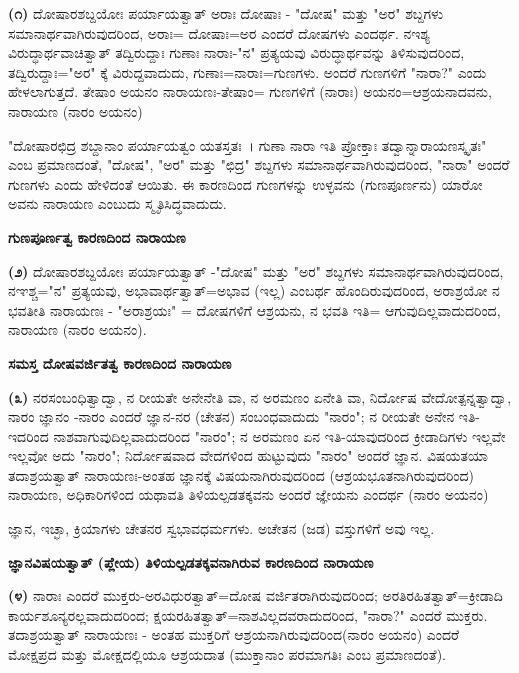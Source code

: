 \smallskip

\textbf{(೧)} ದೋಷಾರಶಬ್ದಯೋಃ ಪರ್ಯಾಯತ್ವಾತ್ ಅರಾಃ ದೋಷಾಃ - "ದೋಷ" ಮತ್ತು "ಅರ" ಶಬ್ದಗಳು ಸಮಾನಾರ್ಥವಾಗಿರುವುದರಿಂದ, ಅರಾಃ= ದೋಷಾಃ=ಅರ ಎಂದರೆ ದೋಷಗಳು ಎಂದರ್ಥ. ನಇಶ್ಯ ವಿರುದ್ಧಾರ್ಥವಾಚಿತ್ವಾತ್ ತದ್ವಿರುದ್ದಾಃ ಗುಣಾಃ ನಾರಾಃ-\-"ನ" ಪ್ರತ್ಯಯವು ವಿರುದ್ಧಾರ್ಥವನ್ನು ತಿಳಿಸುವುದರಿಂದ, ತದ್ವಿರುದ್ದಾಃ="ಅರ" ಕ್ಕೆ ವಿರುದ್ದವಾದುದು, ಗುಣಾಃ=ನಾರಾಃ=ಗುಣಗಳು. ಅಂದರೆ ಗುಣಗಳಿಗೆ "ನಾರಾ?" ಎಂದು ಹೇಳಲಾಗುತ್ತದೆ. ತೇಷಾಂ ಅಯನಂ ನಾರಾಯಣಃ-ತೇಷಾಂ= ಗುಣಗಳಿಗೆ (ನಾರಾಃ) ಅಯನಂ=ಆಶ್ರಯನಾದವನು, ನಾರಾಯಣ (ನಾರಂ ಅಯನಂ)

"ದೋಷಾರಛಿದ್ರ ಶಬ್ದಾನಾಂ ಪರ್ಯಾಯತ್ವಂ ಯತಸ್ತತಃ~। ಗುಣಾ ನಾರಾ ಇತಿ ಪ್ರೋಕ್ತಾಃ ತದ್ವಾನ್ನಾರಾಯಣಸ್ಕೃತಃ" ಎಂಬ ಪ್ರಮಾಣದಂತೆ, "ದೋಷ", "ಅರ" ಮತ್ತು "ಛಿದ್ರ" ಶಬ್ದಗಳು ಸಮಾನಾರ್ಥವಾಗಿರುವುದರಿಂದ, "ನಾರಾ" ಅಂದರೆ ಗುಣಗಳು ಎಂದು ಹೇಳಿದಂತೆ ಆಯಿತು. ಈ ಕಾರಣದಿಂದ ಗುಣಗಳನ್ನು ಉಳ್ಳವನು (ಗುಣಪೂರ್ಣನು) ಯಾರೋ ಅವನು ನಾರಾಯಣ ಎಂಬುದು ಸ್ಮೃತಿಸಿದ್ಧವಾದುದು.

\begin{center}
\textbf{ಗುಣಪೂರ್ಣತ್ವ ಕಾರಣದಿಂದ ನಾರಾಯಣ}
\end{center}

\textbf{(೨)} ದೋಷಾರಶಬ್ದಯೋಃ ಪರ್ಯಾಯತ್ವಾತ್ -"ದೋಷ" ಮತ್ತು "ಅರ" ಶಬ್ದಗಳು ಸಮಾನಾರ್ಥವಾಗಿರುವುದರಿಂದ, ನಞಶ್ಚ="ನ" ಪ್ರತ್ಯಯವು, ಅಭಾವಾರ್ಥತ್ವಾತ್=ಅಭಾವ (ಇಲ್ಲ) ಎಂಬರ್ಥ ಹೊಂದಿರುವುದರಿಂದ, ಅರಾಶ್ರಯೋ ನ ಭವತೀತಿ ನಾರಾಯಣಃ - "ಅರಾಶ್ರಯಃ" = ದೋಷಗಳಿಗೆ ಆಶ್ರಯನು, ನ ಭವತಿ ಇತಿ= ಆಗುವುದಿಲ್ಲವಾದುದರಿಂದ, ನಾರಾಯಣ (ನಾರಂ ಅಯನಂ).

\begin{center}
\textbf{ಸಮಸ್ತ ದೋಷವರ್ಜಿತತ್ವ ಕಾರಣದಿಂದ ನಾರಾಯಣ}
\end{center}

\textbf{(೩)} ನರಸಂಬಂಧಿತ್ವಾದ್ವಾ, ನ ರೀಯತೇ ಅನೇನೇತಿ ವಾ, ನ ಅರಮಣಂ ಏನೇತಿ ವಾ, ನಿರ್ದೋಷ ವೇದೋತ್ಪನ್ನತ್ವಾದ್ವಾ, ನಾರಂ ಜ್ಞಾನಂ -ನಾರಂ ಎಂದರೆ ಜ್ಞಾನ-ನರ (ಚೇತನ) ಸಂಬಂಧವಾದುದು "ನಾರಂ"; ನ ರೀಯತೇ ಅನೇನ ಇತಿ-ಇದರಿಂದ ನಾಶವಾಗುವುದಿಲ್ಲವಾದುದರಿಂದ "ನಾರಂ"; ನ ಅರಮಣಂ ಏನ ಇತಿ-ಯಾವುದರಿಂದ ಕ್ರೀಡಾದಿಗಳು ಇಲ್ಲವೇ ಇಲ್ಲವೋ ಅದು "ನಾರಂ"; ನಿರ್ದೋಷವಾದ ವೇದಗಳಿಂದ ಹುಟ್ಟುವುದು "ನಾರಂ" ಅಂದರೆ ಜ್ಞಾನ. ವಿಷಯತಯಾ ತದಾಶ್ರಯತ್ವಾತ್ ನಾರಾಯಣಃ-ಅಂತಹ ಜ್ಞಾನಕ್ಕೆ ವಿಷಯನಾಗಿರುವುದರಿಂದ (ಆಶ್ರಯಭೂತನಾಗಿರುವುದರಿಂದ) ನಾರಾಯಣ, ಅಧಿಕಾರಿಗಳಿಂದ ಯಥಾವತಿ ತಿಳಿಯಲ್ಪಡತಕ್ಕವನು ಅಂದರೆ ಜ್ಞೇಯನು ಎಂದರ್ಥ (ನಾರಂ ಅಯನಂ)

ಜ್ಞಾನ, ಇಚ್ಛಾ, ಕ್ರಿಯಾಗಳು ಚೇತನರ ಸ್ವಭಾವಧರ್ಮಗಳು. ಅಚೇತನ (ಜಡ) ವಸ್ತುಗಳಿಗೆ ಅವು ಇಲ್ಲ.

\newpage

\begin{center}
\textbf{ಜ್ಞಾನವಿಷಯತ್ವಾತ್ (ಪ್ಲೇಯ) ತಿಳಿಯಲ್ಪಡತಕ್ಕವನಾಗಿರುವ ಕಾರಣದಿಂದ ನಾರಾಯಣ}
\end{center}

\textbf{(೪)} ನಾರಾಃ ಎಂದರೆ ಮುಕ್ತರು-ಅರವಿಧುರತ್ವಾತ್=ದೋಷ ವರ್ಜಿತರಾಗಿರುವುದರಿಂದ; ಅರತಿರಹಿತತ್ವಾತ್=ಕ್ರೀಡಾದಿ ಕಾರ್ಯಶೂನ್ಯರಲ್ಲವಾದುದರಿಂದ; ಕ್ಷಯರಹಿತ\-ತ್ವಾತ್=ನಾಶ\-ವಿಲ್ಲದವರಾದುದರಿಂದ, "ನಾರಾ?" ಎಂದರೆ ಮುಕ್ತರು. ತದಾಶ್ರಯತ್ವಾತ್ ನಾರಾಯಣಃ - ಅಂತಹ ಮುಕ್ತರಿಗೆ ಆಶ್ರಯನಾಗಿರುವುದರಿಂದ(ನಾರಂ ಅಯನಂ) ಎಂದರೆ ಮೋಕ್ಷಪ್ರದ ಮತ್ತು ಮೋಕ್ಷದಲ್ಲಿಯೂ ಆಶ್ರಯದಾತ (ಮುಕ್ತಾನಾಂ ಪರಮಾಗತಿಃ ಎಂಬ ಪ್ರಮಾಣದಂತೆ).

